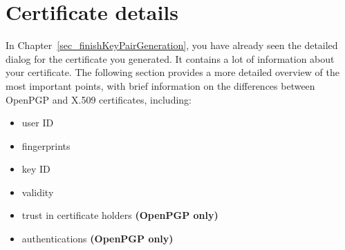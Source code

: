 \documentclass[a4paper,11pt,oneside,openright,titlepage]{scrbook}
\begin{document}
\label{part:AdvancedUsers}


\clearpage
\chapter{Certificate details}
\label{ch:CertificateDetails}

In Chapter~\ref{sec_finishKeyPairGeneration}, you have already seen
the detailed dialog for the certificate you generated. It contains a
lot of information about your certificate. The following section
provides a more detailed overview of the most important points, with
brief information on the differences between OpenPGP and X.509
certificates, including:

\begin{itemize}
\item user ID
\item fingerprints
\item key ID
\item validity
\item trust in certificate holders \textbf{(OpenPGP only)}
\item authentications \textbf{(OpenPGP only)}
\end{itemize}
\end{document}
